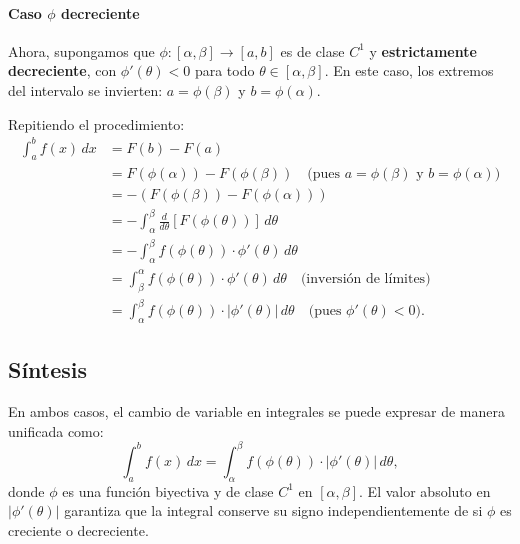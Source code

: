 \documentclass[12pt,a4paper]{article}
\begin{document}
\paragraph{Caso $\phi$ decreciente}
Ahora, supongamos que $\phi: [\alpha, \beta] \to [a, b]$ es de clase $C^1$ y \textbf{estrictamente decreciente}, con $\phi'(\theta) < 0$ para todo $\theta \in [\alpha, \beta]$. En este caso, los extremos del intervalo se invierten: $a = \phi(\beta)$ y $b = \phi(\alpha)$.

Repitiendo el procedimiento:
\begin{align*}
\int_{a}^{b} f(x) \, dx &= F(b) - F(a) \\
&= F(\phi(\alpha)) - F(\phi(\beta)) \quad \text{(pues $a = \phi(\beta)$ y $b = \phi(\alpha)$)} \\
&= - \left( F(\phi(\beta)) - F(\phi(\alpha)) \right) \\
&= - \int_{\alpha}^{\beta} \frac{d}{d\theta} [F(\phi(\theta))] \, d\theta \\
&= - \int_{\alpha}^{\beta} f(\phi(\theta)) \cdot \phi'(\theta) \, d\theta \\
&= \int_{\beta}^{\alpha} f(\phi(\theta)) \cdot \phi'(\theta) \, d\theta \quad \text{(inversión de límites)} \\
&= \int_{\alpha}^{\beta} f(\phi(\theta)) \cdot |\phi'(\theta)| \, d\theta \quad \text{(pues $\phi'(\theta) < 0$)}.
\end{align*}

\subsection{Síntesis}
En ambos casos, el cambio de variable en integrales se puede expresar de manera unificada como:
\[
\int_{a}^{b} f(x) \, dx = \int_{\alpha}^{\beta} f(\phi(\theta)) \cdot |\phi'(\theta)| \, d\theta,
\]
donde $\phi$ es una función biyectiva y de clase $C^1$ en $[\alpha, \beta]$. El valor absoluto en $|\phi'(\theta)|$ garantiza que la integral conserve su signo independientemente de si $\phi$ es creciente o decreciente.


\end{document}
